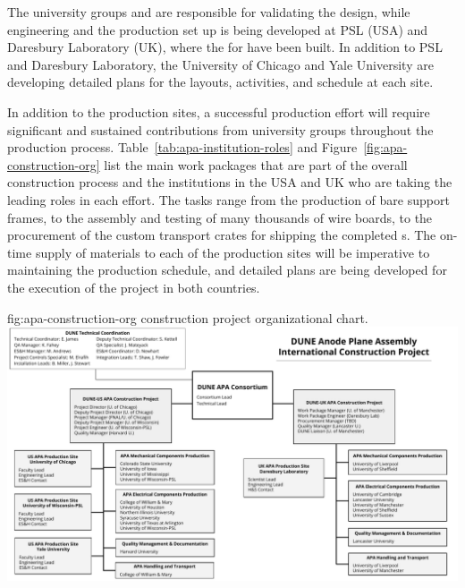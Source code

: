 The university groups and  are responsible for validating  the design, while engineering and the production set up is being developed at PSL %
(USA) and Daresbury Laboratory (UK), where the  for  have been built. 
In addition to PSL and Daresbury Laboratory, the University of Chicago and Yale University are developing detailed plans for the layouts, activities, and schedule at each site. 


In addition to the  production sites, a successful production effort will require significant and sustained contributions from university groups throughout the production process.  Table~\ref{tab:apa-institution-roles} and Figure~\ref{fig:apa-construction-org} list the main work packages that are part of the overall  construction process and the institutions in the USA and UK who are taking the leading roles in each effort.  The tasks range from the production of bare support frames, to the assembly and testing of many thousands of wire boards, to the procurement of the custom transport crates for shipping the completed s.  The on-time supply of materials to each of the  production sites will be imperative to maintaining the production schedule, and detailed plans are being developed for the execution of the project in both countries. 



\begin{dunefigure}{fig:apa-construction-org}
{ construction project organizational chart.}
\includegraphics[width=1\textwidth,trim=0mm 0mm 0mm 0mm,clip]{graphics/sp-apa-construction-org-chart.pdf}
\end{dunefigure}

